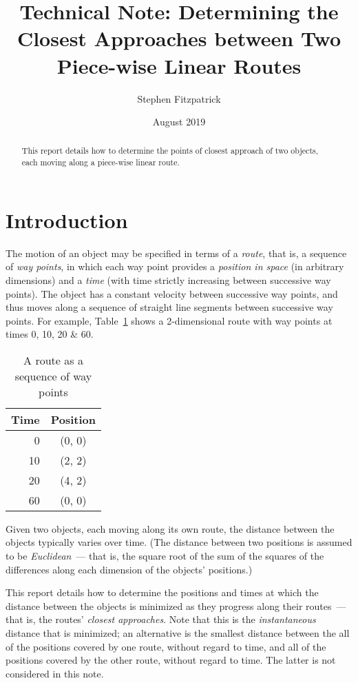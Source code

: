 \documentclass[times,12pt]{article}
\title{Technical Note: Determining the Closest Approaches between Two Piece-wise Linear Routes}
\author{Stephen Fitzpatrick}
\date{August 2019}
\begin{document}
\maketitle
\begin{abstract}
	This report details how to determine the points of closest approach of two objects, each moving along a piece-wise linear route.
\end{abstract}

\section{Introduction}
The motion of an object may be specified in terms of a \textit{route}, that is, a sequence of \textit{way points}, in which each way point provides a \emph{position in space} (in arbitrary dimensions) and a \emph{time} (with time strictly increasing between successive way points). The object has a constant velocity between successive way points, and thus moves along a sequence of straight line segments between successive way points. For example, Table~\ref{fig:a-route} shows a 2-dimensional route with way points at times 0, 10, 20 \& 60.

\begin{table}[htbp]
	\centering
	\begin{tabular}[t]{|r|c|} \hline
		Time & Position \\ \hline
		0 & (0, 0) \\ \hline
		10 & (2, 2) \\ \hline
		20 & (4, 2) \\ \hline
		60 & (0, 0) \\ \hline
	\end{tabular}
\caption{A route as a sequence of way points}
\label{fig:a-route}
\end{table}

Given two objects, each moving along its own route, the distance between the objects typically varies over time. (The distance between two positions is assumed to be \textit{Euclidean}~--- that is, the square root of the sum of the squares of the differences along each dimension of the objects' positions.)

This report details how to determine the positions and times at which the distance between the objects is minimized as they progress along their routes~--- that is, the routes' \textit{closest approaches}. Note that this is the \emph{instantaneous} distance that is minimized; an alternative is the smallest distance between the all of the positions covered by one route, without regard to time, and all of the positions covered by the other route, without regard to time. The latter is not considered in this note.
\end{document}
